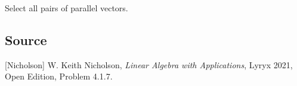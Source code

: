 \documentclass{ximera}
\author{}
\begin{document}
\begin{exercise}
Select all pairs of parallel vectors.

\begin{selectAll}
 \end{selectAll}

 
\end{exercise}

\subsection*{Source}
[Nicholson] W. Keith Nicholson, {\it Linear Algebra with Applications}, Lyryx 2021, Open Edition, Problem 4.1.7.
\end{document}
